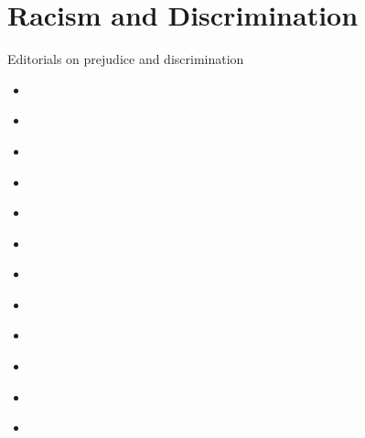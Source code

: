 \documentclass[letterpaper,10pt,english]{jupyterBook}
\begin{document}
\chapter{Racism and Discrimination}
\label{\detokenize{Sections/racism:racism-and-discrimination}}\label{\detokenize{Sections/racism::doc}}
\sphinxAtStartPar
Editorials on prejudice and discrimination
\begin{itemize}
\item {} 
\sphinxAtStartPar
{\hyperref[\detokenize{Volumes/01/03/social_equality::doc}]{}}

\item {} 
\sphinxAtStartPar
{\hyperref[\detokenize{Volumes/01/03/ashamed::doc}]{}}

\item {} 
\sphinxAtStartPar
{\hyperref[\detokenize{Volumes/03/04/light::doc}]{}}

\item {} 
\sphinxAtStartPar
{\hyperref[\detokenize{Volumes/06/02/logic::doc}]{}}

\item {} 
\sphinxAtStartPar
{\hyperref[\detokenize{Volumes/10/01/clansman::doc}]{}}

\item {} 
\sphinxAtStartPar
{\hyperref[\detokenize{Volumes/12/05/conduct_not_color::doc}]{}}

\item {} 
\sphinxAtStartPar
{\hyperref[\detokenize{Volumes/12/06/migration::doc}]{}}

\item {} 
\sphinxAtStartPar
{\hyperref[\detokenize{Volumes/24/01/slavery::doc}]{}}

\item {} 
\sphinxAtStartPar
{\hyperref[\detokenize{Volumes/31/04/newer_south::doc}]{}}

\item {} 
\sphinxAtStartPar
{\hyperref[\detokenize{Volumes/34/02/higher_friction::doc}]{}}

\item {} 
\sphinxAtStartPar
{\hyperref[\detokenize{Volumes/34/09/prejudice::doc}]{}}

\item {} 
\sphinxAtStartPar
{\hyperref[\detokenize{Volumes/40/07/protest::doc}]{}}

\end{itemize}
\end{document}
